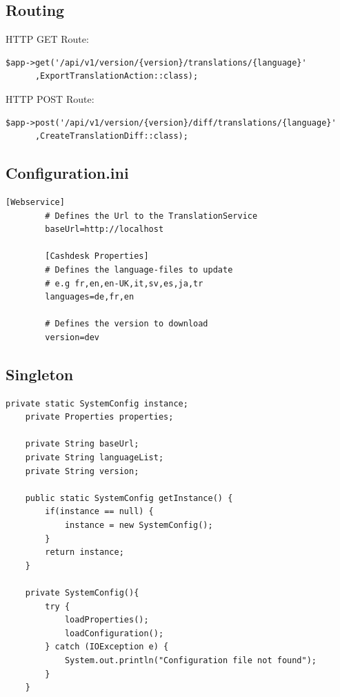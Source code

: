 \documentclass[10pt, oneside, ngerman]{article}
\begin{document}
  \subsection{Routing}\label{sec:lst:routes}
  HTTP GET Route:
  \begin{lstlisting}[caption={Erstellen einer HTTP GET Route}, captionpos=b, label=lst:impl:bl:GET]
    $app->get('/api/v1/version/{version}/translations/{language}'
      ,ExportTranslationAction::class);
  \end{lstlisting}
  HTTP POST Route:
  \begin{lstlisting}[caption={Erstellen einer HTTP POST Route}, captionpos=b, label=lst:impl:bl:POST]
    $app->post('/api/v1/version/{version}/diff/translations/{language}'
      ,CreateTranslationDiff::class);
  \end{lstlisting}
  \newpage
  \subsection{Configuration.ini}\label{lst:impl:ul:config}
    \begin{lstlisting}[caption={Verwendete Konfigurationsdatei}, captionpos=b]
      [Webservice]
        # Defines the Url to the TranslationService
        baseUrl=http://localhost

        [Cashdesk Properties]
        # Defines the language-files to update
        # e.g fr,en,en-UK,it,sv,es,ja,tr
        languages=de,fr,en

        # Defines the version to download
        version=dev
    \end{lstlisting}
  \subsection{Singleton}\label{sec:lst:singleton}
  \begin{lstlisting}[caption={Singlton in Java}, captionpos=b]
    private static SystemConfig instance;
    private Properties properties;

    private String baseUrl;
    private String languageList;
    private String version;

    public static SystemConfig getInstance() {
        if(instance == null) {
            instance = new SystemConfig();
        }
        return instance;
    }

    private SystemConfig(){
        try {
            loadProperties();
            loadConfiguration();
        } catch (IOException e) {
            System.out.println("Configuration file not found");
        }
    }
  \end{lstlisting}
\end{document}
